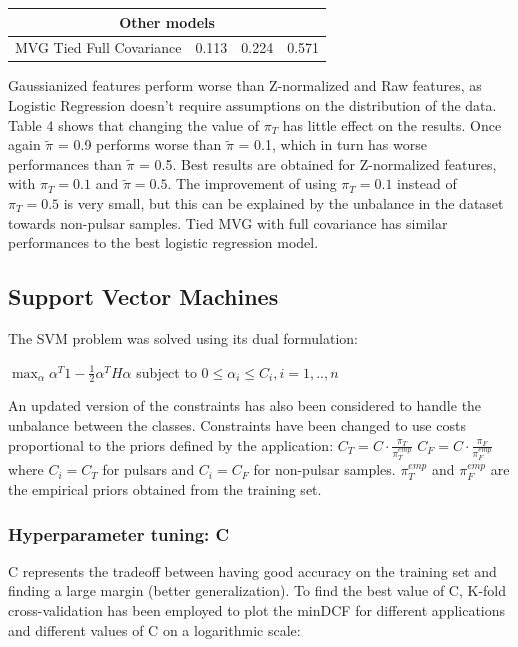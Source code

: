 \documentclass[12pt,a4paper]{article}
\begin{document}
\begin{center}
\begin{tabular}{@{}cccc@{}}
        \hline
        \multicolumn{4}{c}{Other models}                                                                                                \\
        \hline
        MVG Tied Full Covariance                                 & {\color{red} 0.113 }  & 0.224                & 0.571                 \\
    \end{tabular}
\end{center}

Gaussianized features perform worse than Z-normalized and Raw features, as Logistic Regression doesn't require assumptions on the distribution of the data.
Table 4 shows that changing the value of \(\pi_T\) has little effect on the results.
Once again \(\tilde{\pi}\) = 0.9 performs worse than \(\tilde{\pi}\) = 0.1, which in turn has worse performances than \(\tilde{\pi}\) = 0.5.
Best results are obtained for Z-normalized features, with \(\pi_T = 0.1\) and \(\tilde{\pi} = 0.5\).
The improvement of using \(\pi_T = 0.1\) instead of \(\pi_T = 0.5\) is very small, but this can be explained by the unbalance in the dataset towards non-pulsar samples.
Tied MVG with full covariance has similar performances to the best logistic regression model.

\subsection{Support Vector Machines}

The SVM problem was solved using its dual formulation: \\

\begin{center}
    $ \max_{\alpha} \alpha^T1-\frac{1}{2}\alpha^TH\alpha $ subject to $ 0\leq\alpha_i\leq C_i, i=1,..,n $
\end{center}

An updated version of the constraints has also been considered to handle the unbalance between the classes.
Constraints have been changed to use costs proportional to the priors defined by the application:
$ C_T = C \cdot \frac{\pi_T}{\pi_T^{emp}} $
$ C_F = C \cdot \frac{\pi_F}{\pi_F^{emp}} $
where $ C_i = C_T $ for pulsars and $ C_i = C_F $ for non-pulsar samples.
$\pi_T^{emp}$ and $\pi_F^{emp}$ are the empirical priors obtained from the training set.


\subsubsection{Hyperparameter tuning: C}
C represents the tradeoff between having good accuracy on the training set and finding a large margin (better generalization).
To find the best value of C, K-fold cross-validation has been employed to plot the minDCF for different applications and different values of C on a logarithmic scale:
\end{document}
